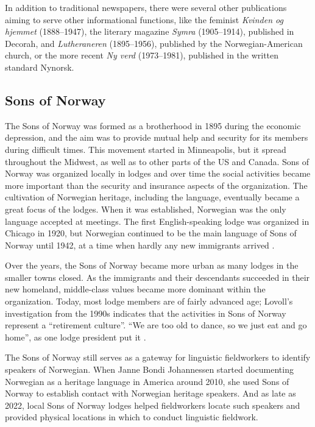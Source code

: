 \documentclass[output=paper]{langscibook}
\begin{document}
In addition to traditional newspapers, there were several other publications aiming to serve other informational functions, like the feminist \textit{Kvinden og hjemmet} (1888--1947), the literary magazine \textit{Symra} (1905--1914), published in Decorah, and \textit{Lutheraneren} (1895--1956), published by the Norwegian\hyp American church, or the more recent \textit{Ny verd} (1973--1981), published in the written standard Nynorsk.

\subsection{Sons of Norway}\label{sec:hjelde:6.3}

The Sons of Norway was formed as a brotherhood in 1895 during the economic depression, and the aim was to provide mutual help and security for its members during difficult times. This movement started in Minneapolis, but it spread throughout the Midwest, as well as to other parts of the US and Canada. Sons of Norway was organized locally in lodges and over time the social activities became more important than the security and insurance aspects of the organization. The cultivation of Norwegian heritage, including the language, eventually became a great focus of the lodges. When it was established, Norwegian was the only language accepted at meetings. The first English-speaking lodge was organized in Chicago in 1920, but Norwegian continued to be the main language of Sons of Norway until 1942, at a time when hardly any new immigrants arrived \citep[200]{Lovoll1998}. 

Over the years, the Sons of Norway became more urban as many lodges in the smaller towns closed. As the immigrants and their descendants succeeded in their new homeland, middle-class values became more dominant within the organization. Today, most lodge members are of fairly advanced age; Lovoll’s investigation from the 1990s indicates that the activities in Sons of Norway represent a “retirement culture”. “We are too old to dance, so we just eat and go home”, as one lodge president put it \citep[202]{Lovoll1998}. 

The Sons of Norway still serves as a gateway for linguistic fieldworkers to identify speakers of Norwegian. When Janne Bondi Johannessen started documenting Norwegian as a heritage language in America around 2010, she used Sons of Norway to establish contact with Norwegian heritage speakers. And as late as 2022, local Sons of Norway lodges helped fieldworkers locate such speakers and provided physical locations in which to conduct linguistic fieldwork.
\end{document}
